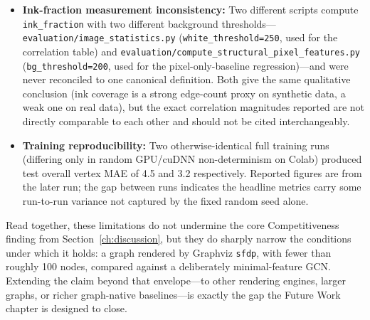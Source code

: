 \documentclass[11pt,letterpaper]{article}
\numberwithin{equation}{section}
\numberwithin{figure}{section}
\numberwithin{table}{section}
\begin{document}
\begin{itemize}
    \item \textbf{Ink-fraction measurement inconsistency:} Two different scripts compute \texttt{ink\_fraction} with two different background thresholds---\texttt{evaluation/\allowbreak image\_statistics.py} (\texttt{white\_threshold=250}, used for the correlation table) and \texttt{evaluation/\allowbreak compute\_\allowbreak structural\_\allowbreak pixel\_\allowbreak features.py} (\texttt{bg\_threshold=200}, used for the pixel-only-baseline regression)---and were never reconciled to one canonical definition. Both give the same qualitative conclusion (ink coverage is a strong edge-count proxy on synthetic data, a weak one on real data), but the exact correlation magnitudes reported are not directly comparable to each other and should not be cited interchangeably.
    \item \textbf{Training reproducibility:} Two otherwise-identical full training runs (differing only in random GPU/cuDNN non-determinism on Colab) produced test overall vertex MAE of 4.5 and 3.2 respectively. Reported figures are from the later run; the gap between runs indicates the headline metrics carry some run-to-run variance not captured by the fixed random seed alone.
\end{itemize}

Read together, these limitations do not undermine the core Competitiveness finding from Section~\ref{ch:discussion}, but they do sharply narrow the conditions under which it holds: a graph rendered by Graphviz \texttt{sfdp}, with fewer than roughly 100 nodes, compared against a deliberately minimal-feature GCN. Extending the claim beyond that envelope---to other rendering engines, larger graphs, or richer graph-native baselines---is exactly the gap the Future Work chapter is designed to close.

\end{document}
